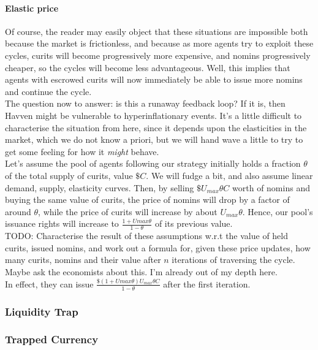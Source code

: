 \paragraph{Elastic price} Of course, the reader may easily object that these situations are impossible both
because the market is frictionless, and because as more agents try to exploit
these cycles, curits will become progressively more expensive, and nomins
progressively cheaper, so the cycles will become less advantageous.
Well, this implies that agents with escrowed curits will now immediately be
able to issue more nomins and continue the cycle. \\
The question now to answer: is this a runaway feedback loop? If it is,
then Havven might be vulnerable to hyperinflationary events.
It's a little difficult to characterise the situation from here, since it depends upon the
elasticities in the market, which we do not know a priori, but we will hand wave a little to try to
get some feeling for how it \textit{might} behave. \\

Let's assume the pool of agents following our strategy initially holds a fraction
\(\theta\) of the total supply of curits, value \(\$C\). We will fudge a bit, and also assume linear
demand, supply, elasticity curves. 
Then, by selling \(\$ U_{max} \theta C\) worth of nomins and buying the same value of
curits, the price of nomins will drop by a factor of around \(\theta\), 
while the price of curits will increase by about \(U_{max} \theta\).
Hence, our pool's issuance rights will increase to \(\frac{1 + U{max} \theta}{1 - \theta}\)
of its previous value.\\

\textsc{TODO:} Characterise the result of these assumptions w.r.t the value of
held curits, issued nomins, and work out a formula for, given these price
updates, how many curits, nomins and their value after \(n\) iterations of
traversing the cycle. Maybe ask the economists about this. I'm already out of
my depth here. \\

In effect, they can issue \(\frac{\$ (1 + U{max} \theta) U_{max} \theta C}{1 - \theta}\)
after the first iteration.

\subsubsection{Liquidity Trap}
\subsubsection{Trapped Currency}


